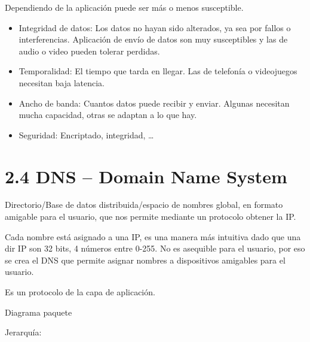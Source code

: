 \documentclass[12pt, twoside, openright]{report} %
\begin{document}
Dependiendo de la aplicación puede ser más o menos susceptible.

\begin{itemize}
	\item Integridad de datos: Los datos no hayan sido alterados, ya sea por
	      fallos o interferencias. Aplicación de envío de datos son muy
	      susceptibles y las de audio o video pueden tolerar perdidas.
	\item Temporalidad: El tiempo que tarda en llegar. Las de telefonía o
	      videojuegos necesitan baja latencia.
	\item Ancho de banda: Cuantos datos puede recibir y enviar. Algunas
	      necesitan mucha capacidad, otras se adaptan a lo que hay.
	\item Seguridad: Encriptado, integridad, \ldots{}
\end{itemize}

\section{2.4 DNS -- Domain Name System}

Directorio/Base de datos distribuida/espacio de nombres global, en
formato amigable para el usuario, que nos permite mediante un
protocolo obtener la IP.

Cada nombre está asignado a una IP, es una manera más intuitiva
dado que una dir IP son 32 bits, 4 números entre 0-255. No es
asequible para el usuario, por eso se crea el DNS que permite
asignar nombres a dispositivos amigables para el usuario.

Es un protocolo de la capa de aplicación.

Diagrama paquete
\begin{figure}[H]
	{\def\svgwidth{.5\textwidth}
		}
\end{figure}
Jerarquía:
\end{document}
